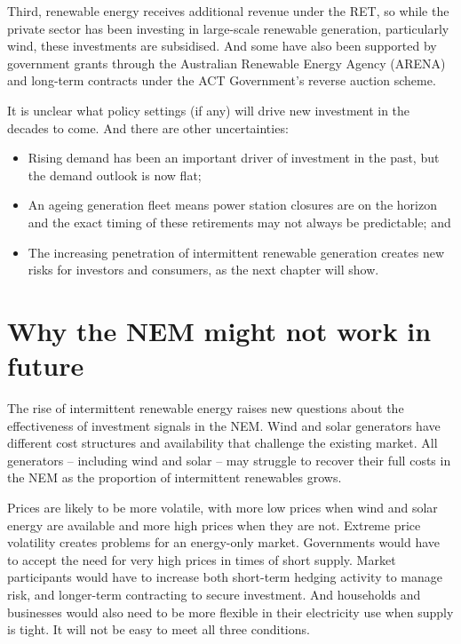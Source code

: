 \documentclass[FrontPage]{grattan}
\begin{document}
Third, renewable energy receives additional revenue under the RET, so while the private sector has been investing in large-scale renewable generation, particularly wind, these investments are subsidised. And some have also been supported by government grants through the Australian Renewable Energy Agency (ARENA) and long-term contracts under the ACT Government's reverse auction scheme.

It is unclear what policy settings (if any) will drive new investment in the decades to come. And there are other uncertainties: 
\begin{itemize}
    \item Rising demand has been an important driver of investment in the past, but the demand outlook is now flat; 
    \item An ageing generation fleet means power station closures are on the horizon and the exact timing of these retirements may not always be predictable; and
    \item The increasing penetration of intermittent renewable generation creates new risks for investors and consumers, as the next chapter will show.
\end{itemize}



\chapter{Why the NEM might not work in future }\label{chap:why-the-NEM-might-not-work-in-future}
The rise of intermittent renewable energy raises new questions about the effectiveness of investment signals in the NEM\@. Wind and solar generators have different cost structures and availability that challenge the existing market. All generators -- including wind and solar -- may struggle to recover their full costs in the NEM as the proportion of intermittent renewables grows. 

Prices are likely to be more volatile, with more low prices when wind and solar energy are available and more high prices when they are not. Extreme price volatility creates problems for an energy-only market. Governments would have to accept the need for very high prices in times of short supply. Market participants would have to increase both short-term hedging activity to manage risk, and longer-term contracting to secure investment. And households and businesses would also need to be more flexible in their electricity use when supply is tight. It will not be easy to meet all three conditions.
\end{document}
